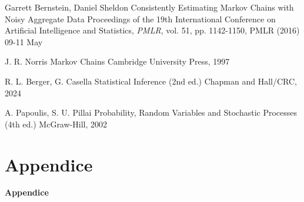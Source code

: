 \documentclass[10pt,xcolor={table,dvipsnames}]{beamer} 		%
\theoremstyle{plain}					%
\theoremstyle{definition}
\theoremstyle{remark}
\begin{document}
    

	\begin{frame}{\refname}
		\begin{thebibliography}{9}
			 Garrett Bernstein, Daniel Sheldon
			\newblock Consistently Estimating Markov Chains with Noisy Aggregate Data
			\newblock Proceedings of the 19th International Conference on Artificial Intelligence and Statistics, \emph{PMLR}, vol. 51, pp. 1142-1150, PMLR (2016) 09-11 May

			 J. R. Norris
			\newblock Markov Chains
			\newblock Cambridge University Press, 1997

			 R. L. Berger, G. Casella
			\newblock Statistical Inference (2nd ed.)
			\newblock Chapman and Hall/CRC, 2024

			 A. Papoulis, S. U. Pillai
			\newblock Probability, Random Variables and Stochastic Processes (4th ed.)
			\newblock McGraw-Hill, 2002
		\end{thebibliography}
	\end{frame}






\section*{Appendice}
	\begin{frame}
		\begin{center}
			\Huge{\textbf{Appendice}}
		\end{center}
	\end{frame}
\end{document}
